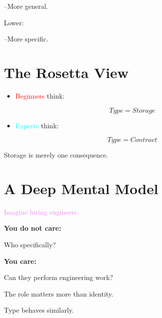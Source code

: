 \documentclass[11pt,a4paper]{book}
\begin{document}
    --More general.


Lower:

    --More specific.


\section{The Rosetta View}
\begin{itemize}
\item \textcolor{red}{Beginners} think:

\[
Type
=
Storage
\]


\item \textcolor{cyan}{Experts} think:

\[
Type
=
Contract
\]
\end{itemize}

Storage is merely one consequence.


\section{A Deep Mental Model}

\begin{mentalmodel}

    \textcolor{violet}{Imagine hiring engineers.}


\textbf{You do not care:}

    Who specifically?


\textbf{You care:}

    Can they perform engineering work?


    The role matters more than identity.

    Type behaves similarly.

\end{mentalmodel}
\end{document}

